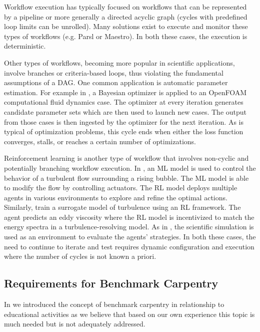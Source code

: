 \documentclass[utf8]{FrontiersinVancouver} %
\begin{document}
Workflow execution has typically focused on workflows that can be represented by a pipeline or more generally a directed acyclic graph (cycles with predefined loop limits can be unrolled). Many solutions exist to execute and monitor these types of workflows (e.g. Parsl or Maestro). In both these cases, the execution is deterministic.

Other types of workflows, becoming more popular in scientific applications, involve branches or criteria-based loops, thus violating the fundamental assumptions of a DAG. One common application is automatic parameter estimation.  For example in \citep{Maric2024OpenFOAM}, a Bayesian optimizer is applied to an OpenFOAM computational fluid dynamics case. The optimizer at every iteration generates candidate parameter sets which are then used to launch new cases. The output from those cases is then ingested by the optimizer for the next iteration. As is typical of optimization problems, this cycle ends when either the loss function converges, stalls, or reaches a certain number of optimizations.

Reinforcement learning is another type of workflow that involves non-cyclic and potentially branching workflow execution. In \citep{Font2024}, an ML model is used to control the behavior of a turbulent flow surrounding a rising bubble. The ML model is able to modify the flow by controlling actuators.  The RL model deploys multiple agents in various environments to explore and refine the optimal actions. Similarly, \citep{Kurz2022} train a surrogate model of turbulence using an RL framework. The agent predicts an eddy viscosity where the RL model is incentivized to match the energy spectra in a turbulence-resolving model. As in \citep{Font24}, the scientific simulation is used as an environment to evaluate the agents' strategies. In both these cases, the need to continue to iterate and test requires dynamic configuration and execution where the number of cycles is not known a priori.



\subsection{Requirements for Benchmark Carpentry}
\label{sec:carpentry}

In \citep{las-frontiers-edu} we introduced the concept of benchmark carpentry in relationship to educational activities as we believe that based on our own experience this topic is much needed but is not adequately addressed. 
\end{document}
